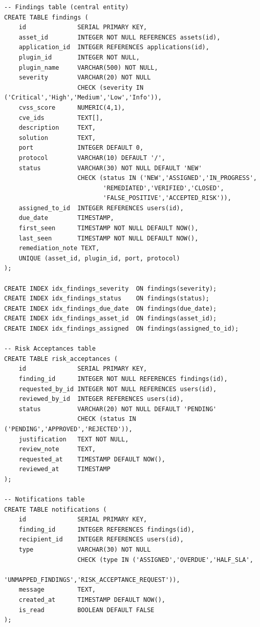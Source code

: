 \begin{lstlisting}[style=sql, caption={Complete VMS Database Schema}, label={lst:fullsql}]
-- Findings table (central entity)
CREATE TABLE findings (
    id              SERIAL PRIMARY KEY,
    asset_id        INTEGER NOT NULL REFERENCES assets(id),
    application_id  INTEGER REFERENCES applications(id),
    plugin_id       INTEGER NOT NULL,
    plugin_name     VARCHAR(500) NOT NULL,
    severity        VARCHAR(20) NOT NULL
                    CHECK (severity IN ('Critical','High','Medium','Low','Info')),
    cvss_score      NUMERIC(4,1),
    cve_ids         TEXT[],
    description     TEXT,
    solution        TEXT,
    port            INTEGER DEFAULT 0,
    protocol        VARCHAR(10) DEFAULT '/',
    status          VARCHAR(30) NOT NULL DEFAULT 'NEW'
                    CHECK (status IN ('NEW','ASSIGNED','IN_PROGRESS',
                           'REMEDIATED','VERIFIED','CLOSED',
                           'FALSE_POSITIVE','ACCEPTED_RISK')),
    assigned_to_id  INTEGER REFERENCES users(id),
    due_date        TIMESTAMP,
    first_seen      TIMESTAMP NOT NULL DEFAULT NOW(),
    last_seen       TIMESTAMP NOT NULL DEFAULT NOW(),
    remediation_note TEXT,
    UNIQUE (asset_id, plugin_id, port, protocol)
);

CREATE INDEX idx_findings_severity  ON findings(severity);
CREATE INDEX idx_findings_status    ON findings(status);
CREATE INDEX idx_findings_due_date  ON findings(due_date);
CREATE INDEX idx_findings_asset_id  ON findings(asset_id);
CREATE INDEX idx_findings_assigned  ON findings(assigned_to_id);

-- Risk Acceptances table
CREATE TABLE risk_acceptances (
    id              SERIAL PRIMARY KEY,
    finding_id      INTEGER NOT NULL REFERENCES findings(id),
    requested_by_id INTEGER NOT NULL REFERENCES users(id),
    reviewed_by_id  INTEGER REFERENCES users(id),
    status          VARCHAR(20) NOT NULL DEFAULT 'PENDING'
                    CHECK (status IN ('PENDING','APPROVED','REJECTED')),
    justification   TEXT NOT NULL,
    review_note     TEXT,
    requested_at    TIMESTAMP DEFAULT NOW(),
    reviewed_at     TIMESTAMP
);

-- Notifications table
CREATE TABLE notifications (
    id              SERIAL PRIMARY KEY,
    finding_id      INTEGER REFERENCES findings(id),
    recipient_id    INTEGER REFERENCES users(id),
    type            VARCHAR(30) NOT NULL
                    CHECK (type IN ('ASSIGNED','OVERDUE','HALF_SLA',
                           'UNMAPPED_FINDINGS','RISK_ACCEPTANCE_REQUEST')),
    message         TEXT,
    created_at      TIMESTAMP DEFAULT NOW(),
    is_read         BOOLEAN DEFAULT FALSE
);


\end{lstlisting}
